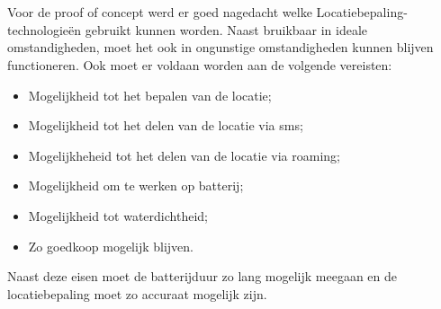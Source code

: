 \section{}
Voor de proof of concept werd er goed nagedacht welke Locatiebepaling-technologieën gebruikt kunnen worden. Naast bruikbaar in ideale omstandigheden, moet het ook in ongunstige omstandigheden kunnen blijven functioneren. Ook moet er voldaan worden aan de volgende vereisten:
\begin{itemize}
    \item Mogelijkheid tot het bepalen van de locatie;
    \item Mogelijkheid tot het delen van de locatie via sms;
    \item Mogelijkheheid tot het delen van de locatie via roaming;
    \item Mogelijkheid om te werken op batterij;
    \item Mogelijkheid tot waterdichtheid;
    \item Zo goedkoop mogelijk blijven.
\end{itemize}
Naast deze eisen moet de batterijduur zo lang mogelijk meegaan en de locatiebepaling moet zo accuraat mogelijk zijn.
